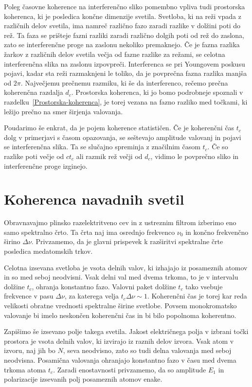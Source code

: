 Poleg časovne koherence na interferenčno sliko pomembno vpliva tudi
prostorska koherenca, ki je posledica
končne dimenzije svetila. Svetloba, ki na reži vpada z različnih delov
svetila, ima namreč različno fazo zaradi razlike v dolžini poti 
do rež. Ta faza se prišteje fazni razliki zaradi različno dolgih poti 
od rež do zaslona, zato se interferenčne proge na zaslonu nekoliko 
premaknejo. Če je fazna razlika žarkov z različnih
delov svetila večja od fazne razlike za režami, se celotna interferenčna
slika na zaslonu izpovpreči. Interferenca se pri Youngovem poskusu
pojavi, kadar sta reži razmaknjeni le toliko, da je povprečna fazna
razlika manjša od $2\pi$. Največjemu prečnemu razmiku, ki še da interferenco,
rečemo prečna koherenčna razdalja $d_{c}$. 
Prostorska koherenca, ki jo bomo podrobneje spoznali v razdelku~\ref{Prostorska-koherenca},
je torej vezana na fazno razliko med točkami, ki ležijo prečno 
na smer širjenja valovanja.

Poudarimo še enkrat, da je pojem koherence statističen.
Če je koherenčni čas $t_{c}$ dolg v primerjavi s časom opazovanja,
se seštevajo amplitude valovanj in pojavi se interferenčna slika.
Ta se slučajno spreminja z značilnim časom $t_{c}$. Če so razlike
poti večje od $ct_{c}$ ali razmik rež večji od $d_{c}$, vidimo
le povprečno sliko in interferenčne proge izginejo.

\section{Koherenca navadnih svetil}
\label{chap:kns}
Obravnavajmo plinsko razelektritveno cev in z
ustreznim filtrom izberimo eno samo spektralno črto. Ta črta naj ima
osrednjo frekvenco $\nu_{0}$ in končno frekvenčno širino $\Delta\nu$.
Privzamemo, da je glavni prispevek k razširitvi spektralne črte posledica
medatomskih trkov.

Celotna izsevana svetloba je vsota delnih valov, ki izhajajo iz posameznih
atomov in so med seboj neodvisni. Vsak delni val med dvema trkoma, 
to je v intervalu dolžine $t_{c}$, ohranja konstantno fazo. Valovni paket dolžine 
$t_{c}$ tako vsebuje frekvence v pasu $\Delta \nu$,
za katerega velja $t_{c}\Delta\nu\sim1$. Koherenčni čas je torej
kar reda velikosti obratne vrednosti spektralne širine svetlobe. Povsem
monokromatsko valovanje bi imelo neskončen koherenčni čas in bi bilo
popolnoma koherentno.

Zapišimo še izsevano polje takega svetila. 
Jakost električnega polja v izbrani točki prostora je vsota delnih
valov, ki izvirajo iz raznih delov izvora. Vsak atom v izvoru, naj
jih bo $N$, seva neodvisno, zato so tudi delna valovanja med seboj
neodvisna. Posamična valovanja ohranjajo konstantno fazo v času med
dvema trkoma atoma $t_{c}$. Zaradi enostavnosti privzamemo,
da so amplitude $E_{1}$ in polarizacije izsevanih polj posameznih atomov enake. 

